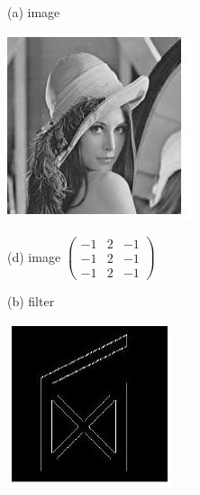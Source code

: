 \documentclass[10pt]{article}
\begin{document}
(a) image

\includegraphics[max width=\textwidth]{2022_01_06_b5ce182ed1bd5f482e5bg-10(1)}

(d) image $\left(\begin{array}{lll}-1 & 2 & -1 \\ -1 & 2 & -1 \\ -1 & 2 & -1\end{array}\right)$

(b) filter

\includegraphics[max width=\textwidth]{2022_01_06_b5ce182ed1bd5f482e5bg-10(2)}
\end{document}
